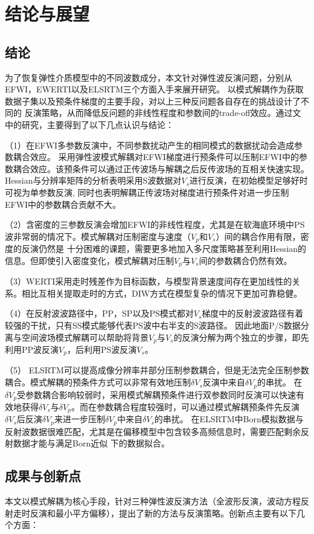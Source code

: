 \chapter{结论与展望}
\section{结论}
为了恢复弹性介质模型中的不同波数成分，本文针对弹性波反演问题，分别从EFWI，EWERTI以及ELSRTM三个方面入手来展开研究。
以模式解耦作为获取数据子集以及预条件梯度的主要手段，对以上三种反问题各自存在的挑战设计了不同的
反演策略，从而降低反问题的非线性程度和参数间的trade-off效应。通过文中的研究，主要得到了以下几点认识与结论：

（1）在EFWI多参数反演中，不同参数扰动产生的相同模式的数据扰动会造成参数耦合效应。
采用弹性波模式解耦对EFWI梯度进行预条件可以压制EFWI中的参数耦合效应。该预条件可以通过正传波场与解耦之后反传波场的互相关快速实现。
Hessian与分辨率矩阵的分析表明采用S波数据对$V_s$进行反演，在初始模型足够好时可视为单参数反演,
同时也表明解耦正传波场对梯度进行预条件对进一步压制EFWI中的参数耦合贡献不大。

（2）含密度的三参数反演会增加EFWI的非线性程度，尤其是在软海底环境中PS波非常弱的情况下。模式解耦对压制密度与速度（$V_p$和$V_s$）间的耦合作用有限，密度的反演仍然是
十分困难的课题，需要更多地加入多尺度策略甚至利用Hessian的信息。但即使引入密度变化，模式解耦对压制$V_p$与$V_s$间的参数耦合仍然有效。

（3）WERTI采用走时残差作为目标函数，与模型背景速度间存在更加线性的关系。相比互相关提取走时的方式，DIW方式在模型复杂的情况下更加可靠稳健。

（4）在反射波波路径中，PP，SP以及PS模式都对$V_s$梯度中的反射波波路径有着较强的干扰，只有SS模式能够代表PS波中右半支的S波路径。
因此地面P/S数据分离与空间波场模式解耦可以帮助将背景$V_p$与$V_s$的反演分解为两个独立的步骤，即先利用PP波反演$V_p$，后利用PS波反演$V_s$。

（5）
ELSRTM可以提高成像分辨率并部分压制参数耦合，但是无法完全压制参数耦合。模式解耦的预条件方式可以非常有效地压制$\delta
V_s$反演中来自$\delta V_p$的串扰。
在$\delta V_p$受参数耦合影响较弱时，采用模式解耦预条件进行双参数同时反演可以快速有效地获得$\delta
V_s$与$\delta V_p$。而在参数耦合程度较强时，可以通过模式解耦预条件先反演$\delta V_s$后反演$\delta
V_p$来进一步压制$\delta V_p$中来自$\delta V_s$的串扰。
在ELSRTM中Born模拟数据与反射波数据很难匹配，尤其是在偏移模型中包含较多高频信息时，需要匹配剩余反射数据才能与满足Born近似
下的数据拟合。
\section{成果与创新点}
本文以模式解耦为核心手段，针对三种弹性波反演方法（全波形反演，波动方程反射走时反演和最小平方偏移），提出了新的方法与反演策略。创新点主要有以下几个方面：

